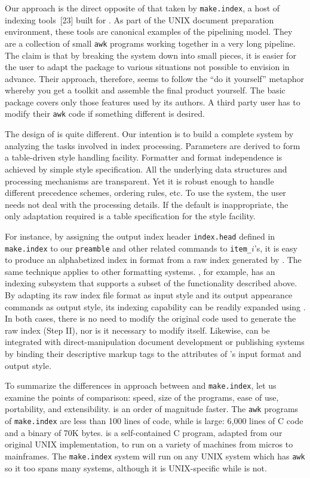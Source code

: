 Our approach is the direct opposite of that taken by \verb|make.index|,
a host of indexing tools~[23] built for {\TF}.
As part of the UNIX {\TF} document
preparation environment, these tools are canonical examples of
the pipelining model.  They are a collection of small \verb|awk|
programs working together in a very long pipeline.
The claim is that by breaking the system down into small pieces, it is
easier for the user to adapt the package to various situations
not possible to envision in advance.  Their approach, therefore, seems
to follow the ``do it yourself'' metaphor whereby you get a toolkit
and assemble the final product yourself.  The basic package covers
only those features used by its authors.  A third party user has to
modify their \verb|awk| code if something different is desired.

The design of {\MI} is quite different.
Our intention is to build a complete system by analyzing
the tasks involved in index processing.  Parameters are derived
to form a table-driven style handling facility.
Formatter and format independence is achieved by
simple style specification.  All the underlying
data structures and processing mechanisms are transparent.
Yet it is robust enough to handle different precedence schemes,
ordering rules, etc.
To use the system, the user needs not deal with the processing
details.  If the default is inappropriate,
the only adaptation required is a table specification for the style facility.

For instance, by assigning the output index header \verb|index.head|
defined in \verb|make.index| to our \verb|preamble| and
other related commands to \verb|item_|$i$'s, it is easy to produce
an alphabetized index in {\TF} format from a raw index generated by {\TF}.
The same technique applies to other formatting systems.
{\SB}, for example, has an indexing subsystem
that supports a subset of the functionality described above.
By adapting its raw index file format as input style and
its output appearance commands as output style, its indexing capability
can be readily expanded using {\MI}.  In both cases,
there is no need to modify the original code used to generate
the raw index (Step II), nor is it necessary to modify {\MI} itself.
Likewise, {\MI} can be integrated with direct-manipulation
document development or publishing systems by binding their descriptive
markup tags to the attributes of {\MI}'s input format and output style.

To summarize the differences in approach between {\MI} and \verb|make.index|,
let us examine the points of comparison: speed, size of the
programs, ease of use, portability, and extensibility.
{\MI} is an order of magnitude faster.  The \verb|awk| programs
of \verb|make.index| are less than 100 lines of code, while {\MI} is large:
6,000 lines of C code and a binary of 70K bytes.  {\MI} is a self-contained
C program, adapted from our original UNIX implementation, to run on
a variety of machines from micros to mainframes.  The \verb|make.index|
system will run on any UNIX system which has \verb|awk| so it too spans
many systems, although it is UNIX-specific while {\MI} is not.

